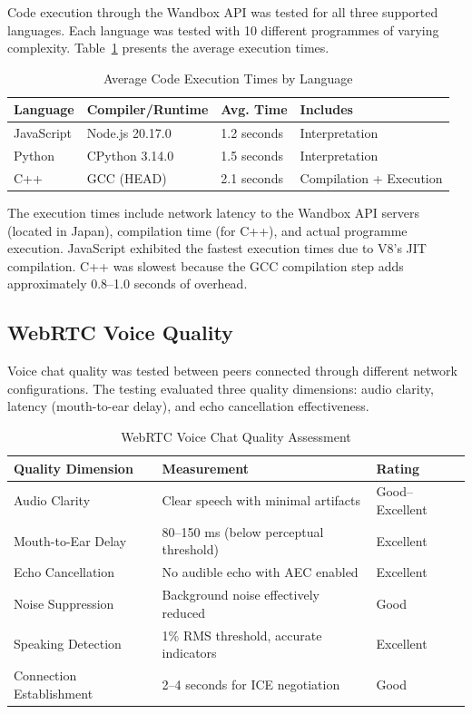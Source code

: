 Code execution through the Wandbox API was tested for all three supported languages. Each language was tested with 10 different programmes of varying complexity. Table~\ref{tab:exectime} presents the average execution times.

\begin{table}[H]
\centering
\caption{Average Code Execution Times by Language}
\label{tab:exectime}
\begin{reporttable}
\begin{tabular}{@{} l l l l @{}}
\toprule
\textbf{Language} & \textbf{Compiler/Runtime} & \textbf{Avg. Time} & \textbf{Includes} \\
\midrule
JavaScript & Node.js 20.17.0 & 1.2 seconds & Interpretation \\
Python & CPython 3.14.0 & 1.5 seconds & Interpretation \\
C++ & GCC (HEAD) & 2.1 seconds & Compilation + Execution \\
\bottomrule
\end{tabular}
\end{reporttable}
\end{table}

The execution times include network latency to the Wandbox API servers (located in Japan), compilation time (for C++), and actual programme execution. JavaScript exhibited the fastest execution times due to V8's JIT compilation. C++ was slowest because the GCC compilation step adds approximately 0.8--1.0 seconds of overhead.

\subsection{WebRTC Voice Quality}

Voice chat quality was tested between peers connected through different network configurations. The testing evaluated three quality dimensions: audio clarity, latency (mouth-to-ear delay), and echo cancellation effectiveness.

\begin{table}[H]
\centering
\caption{WebRTC Voice Chat Quality Assessment}
\label{tab:voicequality}
\begin{reporttable}
\begin{tabular}{@{} l l l @{}}
\toprule
\textbf{Quality Dimension} & \textbf{Measurement} & \textbf{Rating} \\
\midrule
Audio Clarity & Clear speech with minimal artifacts & Good--Excellent \\
Mouth-to-Ear Delay & 80--150 ms (below perceptual threshold) & Excellent \\
Echo Cancellation & No audible echo with AEC enabled & Excellent \\
Noise Suppression & Background noise effectively reduced & Good \\
Speaking Detection & 1\% RMS threshold, accurate indicators & Excellent \\
Connection Establishment & 2--4 seconds for ICE negotiation & Good \\
\bottomrule
\end{tabular}
\end{reporttable}
\end{table}

